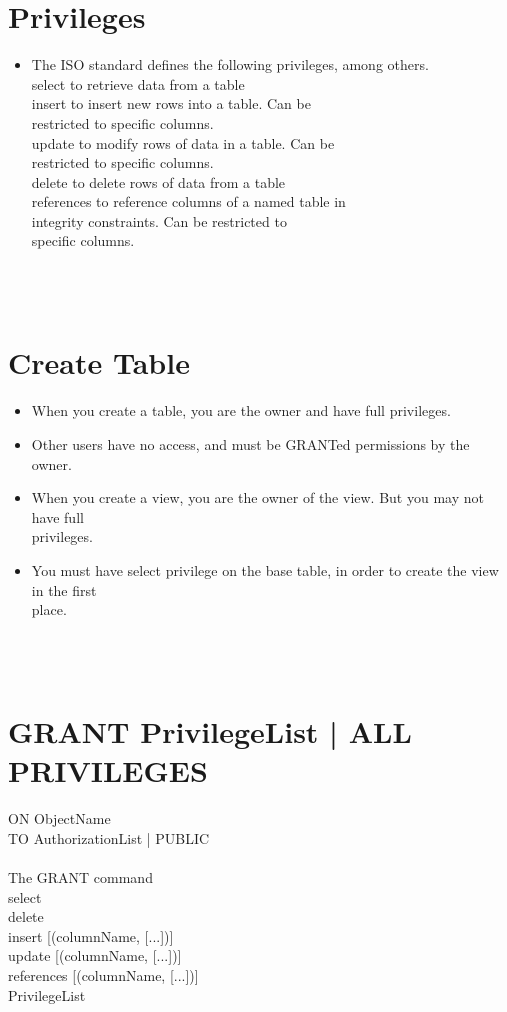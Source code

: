 \documentclass[12pt]{article}
\begin{document}
\section{Privileges}
\begin{itemize}
  \item The ISO standard defines the following privileges, 
among others.\\
select to retrieve data from a table\\
insert to insert new rows into a table. Can be \\
restricted to specific columns.\\
update to modify rows of data in a table. Can be \\
restricted to specific columns.\\
delete to delete rows of data from a table\\
references to reference columns of a named table in \\
integrity constraints. Can be restricted to \\
specific columns.\\
\end{itemize}
\\ 
 \\
\section{Create Table}
\begin{itemize}
  \item When you create a table, you are the 
owner and have full privileges.\\
  \item Other users have no access, and must be 
GRANTed permissions by the owner.\\
  \item When you create a view, you are the owner
of the view. But you may not have full \\
privileges.\\
  \item You must have select privilege on the base 
table, in order to create the view in the first \\
place.\\
\end{itemize}
\\ 
 \\
\section{GRANT {PrivilegeList | ALL PRIVILEGES}}
ON ObjectName\\
TO {AuthorizationList | PUBLIC}\\
[WITH GRANT OPTION]\\
The GRANT command\\
select\\
delete\\
insert [(columnName, [...])]\\
update [(columnName, [...])]\\
references [(columnName, [...])]\\
PrivilegeList\\
\\ 
 \\
\end{document}

